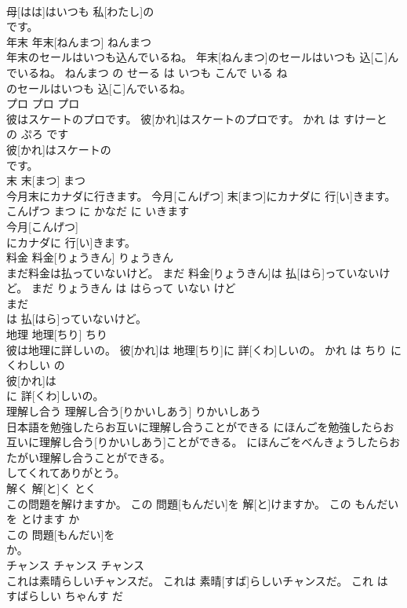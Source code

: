 \documentclass[8pt]{extreport}
\begin{document}
\begin{CJK}{UTF8}{min}
\\	母[はは]はいつも 私[わたし]の
\\	です。			
\\	年末	年末[ねんまつ]	ねんまつ	
\\	年末のセールはいつも込んでいるね。	年末[ねんまつ]のセールはいつも 込[こ]んでいるね。	ねんまつ の せーる は いつも こんで いる ね	
\\	のセールはいつも 込[こ]んでいるね。			
\\	プロ	プロ	プロ	
\\	彼はスケートのプロです。	彼[かれ]はスケートのプロです。	かれ は すけーと の ぷろ です	
\\	彼[かれ]はスケートの
\\	です。			
\\	末	末[まつ]	まつ	
\\	今月末にカナダに行きます。	今月[こんげつ] 末[まつ]にカナダに 行[い]きます。	こんげつ まつ に かなだ に いきます	
\\	今月[こんげつ]
\\	にカナダに 行[い]きます。			
\\	料金	料金[りょうきん]	りょうきん	
\\	まだ料金は払っていないけど。	まだ 料金[りょうきん]は 払[はら]っていないけど。	まだ りょうきん は はらって いない けど	
\\	まだ
\\	は 払[はら]っていないけど。			
\\	地理	地理[ちり]	ちり	
\\	彼は地理に詳しいの。	彼[かれ]は 地理[ちり]に 詳[くわ]しいの。	かれ は ちり に くわしい の	
\\	彼[かれ]は
\\	に 詳[くわ]しいの。			
\\	理解し合う	理解し合う[りかいしあう]	りかいしあう	
\\	日本語を勉強したらお互いに理解し合うことができる	にほんごを勉強したらお互いに理解し合う[りかいしあう]ことができる。	にほんごをべんきょうしたらおたがい理解し合うことができる。	
\\	してくれてありがとう。			
\\	解く	解[と]く	とく	
\\	この問題を解けますか。	この 問題[もんだい]を 解[と]けますか。	この もんだい を とけます か	
\\	この 問題[もんだい]を
\\	か。			
\\	チャンス	チャンス	チャンス	
\\	これは素晴らしいチャンスだ。	これは 素晴[すば]らしいチャンスだ。	これ は すばらしい ちゃんす だ	

\end{CJK}
\end{document}
